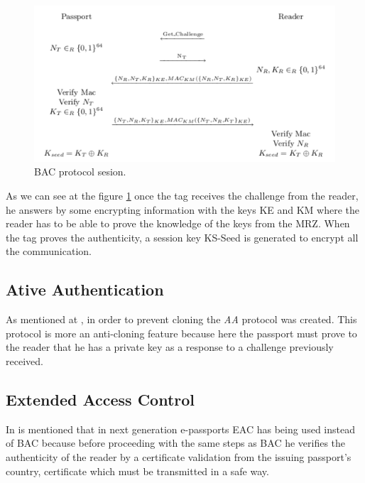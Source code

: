 \documentclass{acm_proc_article-sp}
\begin{document}
\begin{figure}
  \centering
  \includegraphics[scale=0.35]{BAC.pdf}
  \caption{BAC protocol sesion.}
  \label{fig:fig1}
\end{figure}

As we can see at the figure \ref{fig:fig1} once the tag receives the challenge from the reader, he answers 
by some encrypting information with the keys KE and KM where the reader has to be able to prove the 
knowledge of the keys from the MRZ. When the tag proves the authenticity, a session key KS-Seed 
is generated to encrypt all the communication.

\subsection{Ative Authentication}
As mentioned at \cite{JUAR2005}, in order to prevent cloning the \textit{AA} protocol was created. 
This protocol is more an anti-cloning feature because here the passport must prove 
to the reader that he has a private key as a response to a challenge previously received.

\subsection{Extended Access Control}
In \cite{NM12} is mentioned that in next generation e-passports EAC has being used 
instead of BAC because before proceeding with the same steps as BAC he verifies the 
authenticity of the reader by a certificate validation from the issuing passport’s country, 
certificate which must be transmitted in a safe way.

\end{document}
